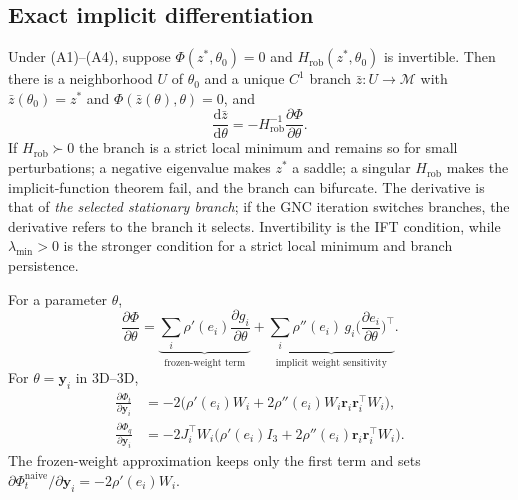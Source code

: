 \subsection{Exact implicit differentiation}

\begin{theorem}\label{thm:ift}
Under (A1)--(A4), suppose $\Phi(z^*,\theta_0)=0$ and
$H_{\mathrm{rob}}(z^*,\theta_0)$ is invertible. Then there is a neighborhood $U$ of $\theta_0$ and
a unique $C^1$ branch $\bar z:U\to\mathcal{M}$ with $\bar z(\theta_0)=z^*$ and
$\Phi(\bar z(\theta),\theta)=0$, and
\begin{equation}
\frac{\mathrm{d}\bar z}{\mathrm{d}\theta}=-H_{\mathrm{rob}}^{-1}\frac{\partial\Phi}{\partial\theta}.
\end{equation}
If $H_{\mathrm{rob}}\succ0$ the branch is a strict local minimum and remains so for small
perturbations; a negative eigenvalue makes $z^*$ a saddle; a singular $H_{\mathrm{rob}}$ makes the
implicit-function theorem fail, and the branch can bifurcate. The derivative is that of \emph{the
selected stationary branch}; if the GNC iteration switches branches, the derivative refers to the
branch it selects. Invertibility is the IFT condition, while $\lambda_{\min}>0$ is the stronger
condition for a strict local minimum and branch persistence.
\end{theorem}

\begin{theorem}\label{thm:rhs}
For a parameter $\theta$,
\begin{equation}
\frac{\partial\Phi}{\partial\theta}
=\underbrace{\sum_i\rho'(e_i)\frac{\partial g_i}{\partial\theta}}_{\text{frozen-weight term}}
+\underbrace{\sum_i\rho''(e_i)\,g_i\Big(\frac{\partial e_i}{\partial\theta}\Big)^\top}
_{\text{implicit weight sensitivity}}.
\end{equation}
For $\theta=\mathbf{y}_i$ in 3D--3D,
\begin{equation}
\begin{aligned}
\frac{\partial\Phi_t}{\partial\mathbf{y}_i}&=-2\big(\rho'(e_i)W_i
+2\rho''(e_i)W_i\mathbf{r}_i\mathbf{r}_i^\top W_i\big),\\
\frac{\partial\Phi_q}{\partial\mathbf{y}_i}&=-2J_i^\top W_i
\big(\rho'(e_i)I_3+2\rho''(e_i)\mathbf{r}_i\mathbf{r}_i^\top W_i\big).
\end{aligned}
\end{equation}
The frozen-weight approximation keeps only the first term and sets
$\partial\Phi_t^{\mathrm{naive}}/\partial\mathbf{y}_i=-2\rho'(e_i)W_i$.
\end{theorem}

